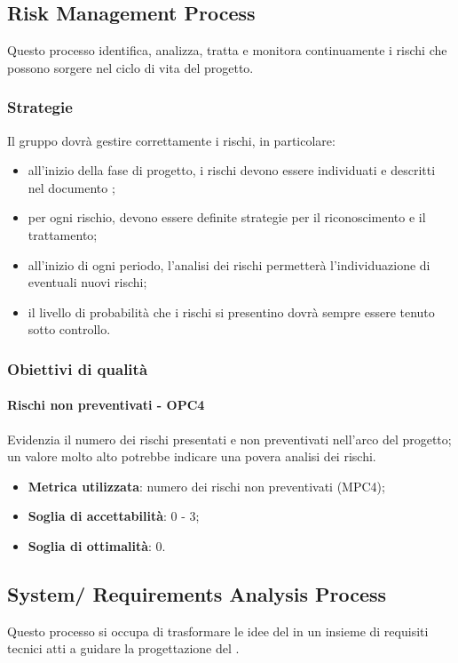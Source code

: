 \documentclass[PdQ.tex]{subfiles}
\begin{document}
	\subsection{Risk Management Process}
		Questo processo identifica, analizza, tratta e monitora continuamente i rischi che possono sorgere nel ciclo di vita del progetto.

		\subsubsection{Strategie}
			Il gruppo dovrà gestire correttamente i rischi, in particolare:
			\begin{itemize}
				\item all'inizio della fase di progetto, i rischi devono essere individuati e descritti nel documento \PPdoc{};
				\item per ogni rischio, devono essere definite strategie per il riconoscimento e il trattamento;
				\item all'inizio di ogni periodo, l'analisi dei rischi permetterà l'individuazione di eventuali nuovi rischi;
				\item il livello di probabilità che i rischi si presentino dovrà sempre essere tenuto sotto controllo.
			\end{itemize}

		\subsubsection{Obiettivi di qualità}
			\paragraph{Rischi non preventivati - OPC4}
				Evidenzia il numero dei rischi presentati e non preventivati nell'arco del progetto; un valore molto alto potrebbe indicare una povera analisi dei rischi.
				\begin{itemize}
					\item \textbf{Metrica utilizzata}: numero dei rischi non preventivati (MPC4);
					\item \textbf{Soglia di accettabilità}: 0 - 3;
					\item \textbf{Soglia di ottimalità}: 0.
				\end{itemize}

	\subsection{System/ Requirements Analysis Process}
		Questo processo si occupa di trasformare le idee del  in un insieme di requisiti tecnici atti a guidare la progettazione del .
\end{document}
